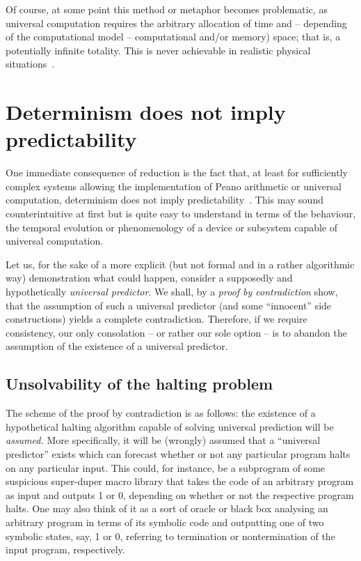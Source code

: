 Of course, at some point this method or metaphor becomes problematic, as universal computation
requires  the arbitrary allocation of time and -- depending of the computational model -- computational and/or memory) space;
that is,  a potentially infinite totality.
This is never achievable in realistic physical situations~\cite{bridgman52,bridgman36,bridgman,gandy1,gandy2}.


\section{Determinism does not imply predictability}
\label{2016-pu-book-chapter-up-dnip}

One immediate consequence of reduction is the fact that,
at least for sufficiently complex systems allowing the implementation of Peano arithmetic or universal computation,
determinism does not imply predictability~\cite{suppes-1993,svozil-93}.
This may sound counterintuitive at first but is quite easy to understand in terms of
the behaviour, the temporal evolution or phenomenology of a device or subsystem capable of universal computation.

Let us, for the sake of a more explicit (but not formal and in a rather algorithmic way) demonstration what could happen,
consider a supposedly and hypothetically {\em universal predictor}.
We shall, by a {\em  proof by contradiction}
show, that the assumption of such a universal predictor (and some ``innocent'' side constructions)
yields a complete contradiction.
Therefore, if we require consistency, our only consolation -- or rather our sole option -- is
to abandon the assumption of the existence of a universal predictor.

\subsection{Unsolvability of the halting problem}

The scheme of the proof by contradiction is as follows:
the existence of a hypothetical halting algorithm
capable of solving universal prediction will be {\em assumed.}
More specifically, it will be (wrongly) assumed that
a ``universal predictor'' exists which can forecast whether or not any particular program halts on any particular input.
This could, for instance, be a subprogram of some suspicious super-duper macro library
that takes the code of an arbitrary program as input and outputs 1 or 0,
depending on whether or not the respective program halts.
One may also think of it as a sort of oracle or black box analysing an arbitrary
program in terms of its symbolic code and outputting one of two symbolic states, say, 1 or 0,
referring to termination or nontermination of the input program, respectively.

